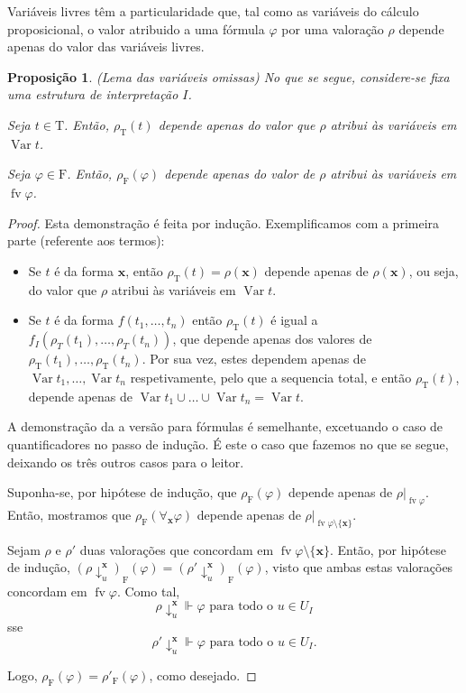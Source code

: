 \documentclass{report}
\newtheorem{prop}{Proposição}
\theoremstyle{definition}
\theoremstyle{remark}
\renewcommand{\bf}[1]{\mathbf{#1}}
\newcommand{\F}{\mathrm{F}}
\newcommand{\T}{\mathrm{T}}
\DeclareMathOperator{\var}{Var}
\DeclareMathOperator{\fv}{fv}
\begin{document}
	Variáveis livres têm a particularidade que, tal como as variáveis do cálculo proposicional, o valor atribuido a uma fórmula $\varphi$ por uma valoração $\rho$ depende apenas do valor das variáveis livres.
	
	\begin{prop} (Lema das variáveis omissas) No que se segue, considere-se fixa uma estrutura de interpretação $I$.
	
	Seja $t \in \T$. Então, $\rho_\T(t)$ depende apenas do valor que $\rho$ atribui às variáveis em $\var t$.
	
	Seja $\varphi \in \F$. Então, $\rho_\F(\varphi)$ depende apenas do valor de $\rho$ atribui às variáveis em $\fv \varphi$.
	\end{prop}
	
	\begin{proof}
	Esta demonstração é feita por indução. Exemplificamos com a primeira parte (referente aos termos):
	
	\begin{itemize}
	\item Se $t$ é da forma $\bf x$, então $\rho_\T(t) = \rho(\bf x)$ depende apenas de $\rho(\bf x)$, ou seja, do valor que $\rho$ atribui às variáveis em $\var t$.
	
	\item Se $t$ é da forma $f(t_1, \dots, t_n)$ então $\rho_\T(t)$ é igual a $f_I(\rho_T(t_1), \dots, \rho_T(t_n))$, que depende apenas dos valores de $\rho_\T(t_1), \dots, \rho_\T(t_n)$. Por sua vez, estes dependem apenas de $\var t_1, \dots, \var t_n$ respetivamente, pelo que a sequencia total, e então $\rho_\T(t)$, depende apenas de $\var t_1 \cup \dots \cup \var t_n = \var t$.
	\end{itemize}
	
	A demonstração da a versão para fórmulas é semelhante, excetuando o caso de quantificadores no passo de indução. É este o caso que fazemos no que se segue, deixando os três outros casos para o leitor.
	
	Suponha-se, por hipótese de indução, que $\rho_\F(\varphi)$ depende apenas de $\rho|_{\fv \varphi}$. Então, mostramos que $\rho_\F(\forall_{\bf x} \varphi)$ depende apenas de $\rho|_{\fv \varphi \setminus \{\bf x\}}$.
	
	Sejam $\rho$ e $\rho'$ duas valorações que concordam em $\fv \varphi \setminus \{\bf x\}$. Então, por hipótese de indução, $(\rho\!\downarrow^{\bf x}_u)_\F(\varphi) = (\rho'\!\downarrow^{\bf x}_u)_\F(\varphi)$, visto que ambas estas valorações concordam em $\fv \varphi$. Como tal,
	\[\rho\!\downarrow^{\bf x}_u \Vdash \varphi \text{ para todo o $u \in U_I$}\]
	sse
	\[\rho'\!\downarrow^{\bf x}_u \Vdash \varphi \text{ para todo o $u \in U_I$.}\]
	
	Logo, $\rho_\F(\varphi) = \rho'_\F(\varphi)$, como desejado.
	\end{proof}
	
\end{document}
